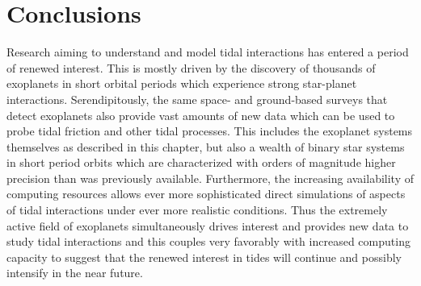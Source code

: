 \section{Conclusions}
%
Research aiming to understand and model tidal interactions has entered a period
of renewed interest. This is mostly driven by the discovery of thousands of
exoplanets in short orbital periods which experience strong star-planet
interactions. Serendipitously, the same space- and ground-based surveys that
detect exoplanets also provide vast amounts of new data which can be used to
probe tidal friction and other tidal processes. This includes the exoplanet
systems themselves as described in this chapter, but also a wealth of binary
star systems in short period orbits which are characterized with orders of
magnitude higher precision than was previously available. Furthermore, the
increasing availability of computing resources allows ever more sophisticated
direct simulations of aspects of tidal interactions under ever more realistic
conditions. Thus the extremely active field of exoplanets simultaneously drives
interest and provides new data to study tidal interactions and this couples very
favorably with increased computing capacity to suggest that the renewed interest
in tides will continue and possibly intensify in the near future.
